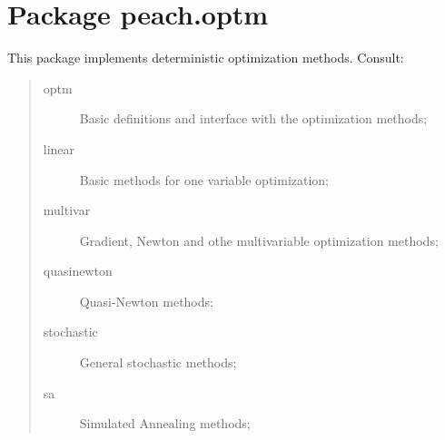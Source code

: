 %
%
%


\section{Package peach.optm}

    \label{peach:optm}

This package implements deterministic optimization methods. Consult:
\begin{quote}
\begin{description}
\item[{optm}] %

Basic definitions and interface with the optimization methods;

\item[{linear}] %

Basic methods for one variable optimization;

\item[{multivar}] %

Gradient, Newton and othe multivariable optimization methods;

\item[{quasinewton}] %

Quasi-Newton methods;

\item[{stochastic}] %

General stochastic methods;

\item[{sa}] %

Simulated Annealing methods;

\end{description}
\end{quote}

